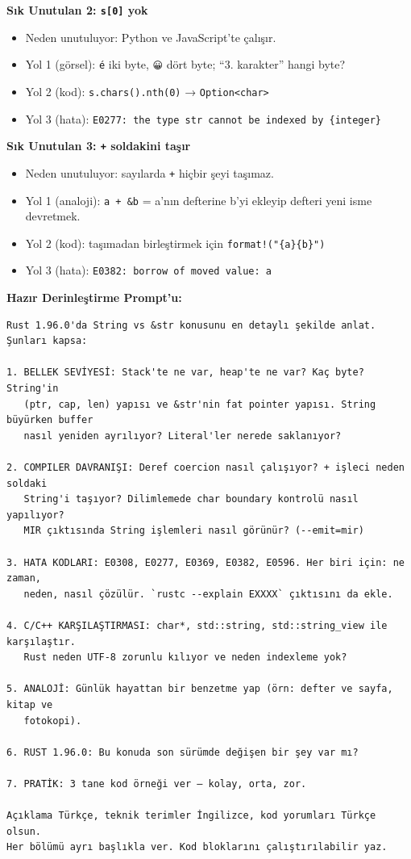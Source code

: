 \documentclass[12pt,a4paper]{article}
\begin{document}
\textbf{Sık Unutulan 2: \texttt{s{[}0{]}} yok}

\begin{itemize}
\tightlist
\item
  Neden unutuluyor: Python ve JavaScript'te çalışır.
\item
  Yol 1 (görsel): \texttt{é} iki byte, \texttt{😀} dört byte; ``3. karakter'' hangi byte?
\item
  Yol 2 (kod): \texttt{s.chars().nth(0)} → \texttt{Option\textless{}char\textgreater{}}
\item
  Yol 3 (hata): \texttt{E0277:\ the\ type\ str\ cannot\ be\ indexed\ by\ \{integer\}}
\end{itemize}

\textbf{Sık Unutulan 3: \texttt{+} soldakini taşır}

\begin{itemize}
\tightlist
\item
  Neden unutuluyor: sayılarda \texttt{+} hiçbir şeyi taşımaz.
\item
  Yol 1 (analoji): \texttt{a\ +\ \&b} = a'nın defterine b'yi ekleyip defteri yeni isme devretmek.
\item
  Yol 2 (kod): taşımadan birleştirmek için \texttt{format!("\{a\}\{b\}")}
\item
  Yol 3 (hata): \texttt{E0382:\ borrow\ of\ moved\ value:\ a}
\end{itemize}

\textbf{Hazır Derinleştirme Prompt'u:}

\begin{verbatim}
Rust 1.96.0'da String vs &str konusunu en detaylı şekilde anlat. Şunları kapsa:

1. BELLEK SEVİYESİ: Stack'te ne var, heap'te ne var? Kaç byte? String'in
   (ptr, cap, len) yapısı ve &str'nin fat pointer yapısı. String büyürken buffer
   nasıl yeniden ayrılıyor? Literal'ler nerede saklanıyor?

2. COMPILER DAVRANIŞI: Deref coercion nasıl çalışıyor? + işleci neden soldaki
   String'i taşıyor? Dilimlemede char boundary kontrolü nasıl yapılıyor?
   MIR çıktısında String işlemleri nasıl görünür? (--emit=mir)

3. HATA KODLARI: E0308, E0277, E0369, E0382, E0596. Her biri için: ne zaman,
   neden, nasıl çözülür. `rustc --explain EXXXX` çıktısını da ekle.

4. C/C++ KARŞILAŞTIRMASI: char*, std::string, std::string_view ile karşılaştır.
   Rust neden UTF-8 zorunlu kılıyor ve neden indexleme yok?

5. ANALOJİ: Günlük hayattan bir benzetme yap (örn: defter ve sayfa, kitap ve
   fotokopi).

6. RUST 1.96.0: Bu konuda son sürümde değişen bir şey var mı?

7. PRATİK: 3 tane kod örneği ver — kolay, orta, zor.

Açıklama Türkçe, teknik terimler İngilizce, kod yorumları Türkçe olsun.
Her bölümü ayrı başlıkla ver. Kod bloklarını çalıştırılabilir yaz.
\end{verbatim}
\end{document}
